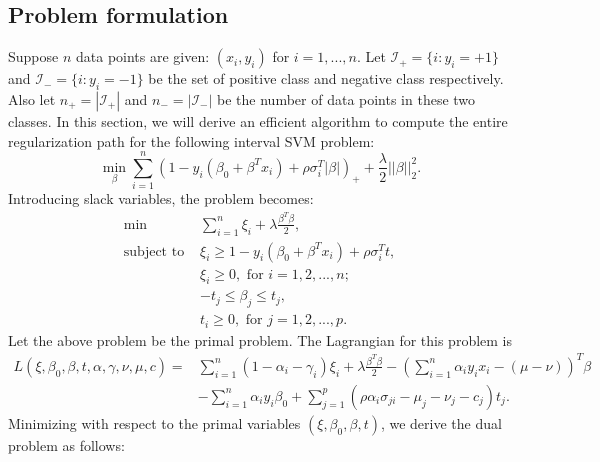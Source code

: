 \documentclass[10pt]{article}
\theoremstyle{definition}
\begin{document}
\subsection{Problem formulation}
Suppose $n$ data points are given: $(x_i,y_i)$ for $i=1,...,n$. Let $\mathcal I_+ = \{i: y_i=+1\}$ and $\mathcal I_- = \{i: y_i=-1\}$ be the set of positive class and negative class respectively. Also let $n_+=|\mathcal I_+|$ and $n_-=|\mathcal I_-|$ be the number of data points in these two classes. In this section, we will derive an efficient algorithm to compute the entire regularization path for the following interval SVM problem:
\begin{equation}
\label{eq:svmInit}
\min_{\beta}\sum_{i=1}^n(1-y_i(\beta_0+\beta^Tx_i)+\rho\sigma_i^T|\beta|)_++\frac{\lambda}{2} ||\beta||_2^2.
\end{equation}
Introducing slack variables, the problem becomes:
\begin{align}
\label{eq:primal}
\min & \sum_{i=1}^n\xi_i + \lambda\frac{\beta^T\beta}{2}, \\
\text{subject to } & \xi_i \geq 1 - y_i(\beta_0+\beta^Tx_i)+\rho \sigma_i^Tt,\nonumber \\
                   & \xi_i \geq 0, \text{ for }i=1,2,...,n; \nonumber\\
                   & -t_j\leq \beta_j \leq t_j,\nonumber\\
                   & t_i \geq 0, \text{ for } j=1,2,...,p. \nonumber                      
\end{align}
Let the above problem be the primal problem. The Lagrangian for this problem is
\[
\begin{array}{rl}
L(\xi,\beta_0,\beta,t,\alpha,\gamma,\nu,\mu,c)
= & \sum_{i=1}^n(1-\alpha_i-\gamma_i)\xi_i + \lambda\frac{\beta^T\beta}{2} - (\sum_{i=1}^n \alpha_iy_ix_i - (\mu-\nu))^T\beta \\
  & - \sum_{i=1}^n\alpha_iy_i\beta_0 + \sum_{j=1}^p(\rho\alpha_i\sigma_{ji} - \mu_j-\nu_j-c_j)t_j.
\end{array}
\]
Minimizing with respect to the primal variables $(\xi,\beta_0,\beta,t)$, we derive the dual problem as follows:
\end{document}
